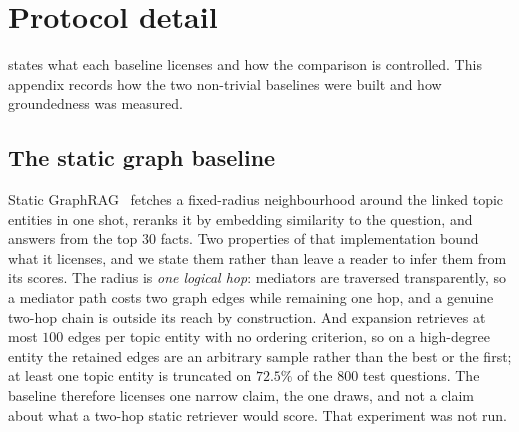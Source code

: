 %
%
%

\section{Protocol detail}\label{app:protocol}

 states what each baseline licenses and how the
comparison is controlled. This appendix records how the two non-trivial
baselines were built and how groundedness was measured.

\subsection{The static graph baseline}\label{app:graphrag}

Static GraphRAG~\cite{edge2024local} fetches a fixed-radius
neighbourhood around the linked topic entities in one shot, reranks it
by embedding similarity to the question, and answers from the top $30$
facts. Two properties of that implementation bound what it licenses, and
we state them rather than leave a reader to infer them from its scores.
The radius is \emph{one logical hop}: mediators are traversed
transparently, so a mediator path costs two graph edges while remaining
one hop, and a genuine two-hop chain is outside its reach by
construction. And expansion retrieves at most $100$ edges per topic
entity with no ordering criterion, so on a high-degree entity the
retained edges are an arbitrary sample rather than the best or the
first; at least one topic entity is truncated on $72.5\%$ of the $800$
test questions. The baseline therefore licenses one narrow claim, the
one  draws, and not a claim about what a two-hop
static retriever would score. That experiment was not run.

